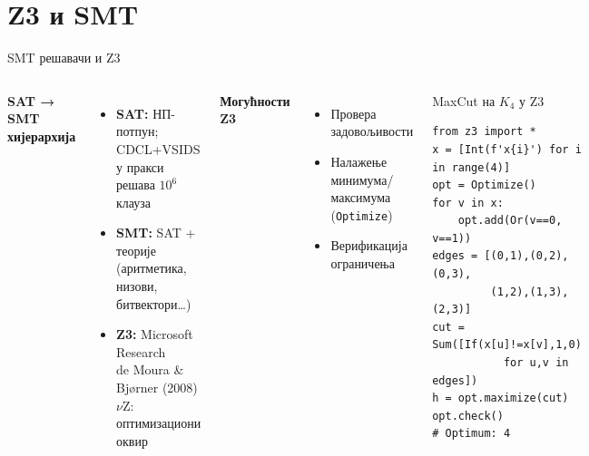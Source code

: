 \documentclass[aspectratio=169]{beamer}
\begin{document}
\section{Z3 и SMT}

\begin{frame}[fragile]{SMT решавачи и Z3}
  \begin{columns}[T]
      \textbf{SAT → SMT хијерархија}
      \begin{itemize}\small
        \item \textbf{SAT:} НП-потпун; CDCL+VSIDS у пракси решава $10^6$ клауза
        \item \textbf{SMT:} SAT + теорије (аритметика, низови, битвектори…)
        \item \textbf{Z3:} Microsoft Research\\
              de Moura \& Bjørner (2008)\\
              $\nu$Z: оптимизациони оквир
      \end{itemize}
      \bigskip
      \textbf{Могућности Z3}
      \begin{itemize}\small
        \item Провера задовољивости
        \item Налажење минимума/максимума (\texttt{Optimize})
        \item Верификација ограничења
      \end{itemize}
      \begin{exampleblock}{MaxCut на $K_4$ у Z3}
        \begin{lstlisting}[style=pysmall]
from z3 import *
x = [Int(f'x{i}') for i in range(4)]
opt = Optimize()
for v in x:
    opt.add(Or(v==0, v==1))
edges = [(0,1),(0,2),(0,3),
         (1,2),(1,3),(2,3)]
cut = Sum([If(x[u]!=x[v],1,0)
           for u,v in edges])
h = opt.maximize(cut)
opt.check()
# Optimum: 4
        \end{lstlisting}
      \end{exampleblock}
    \end{columns}
\end{frame}
\end{document}
